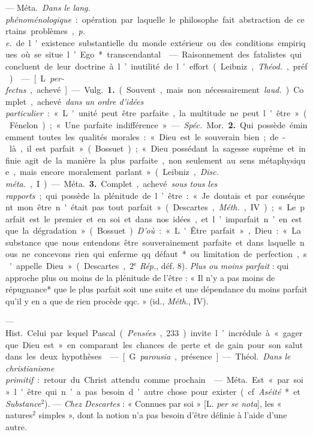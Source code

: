 \begin{itemize}[leftmargin=1cm, label=, itemsep=1pt]
 — \si{Méta.} {\it Dans le lang.
phénoménologique} : opération par laquelle le philosophe fait abstraction de
certains problèmes, {\it p. e.} de l'existence substantielle du monde
extérieur ou des conditions empiriques où se situe l’Ego* transcendantal.

 — Raisonnement des fatalistes qui concluent de
leur doctrine à l’inutilité de l'effort (Leibniz, {\it Théod.}, préf.).

 — [L. {\it per-fectus}, achevé] — \si{Vulg.} {\bf 1.} (Souvent,
mais non nécessairement {\it laud.}). Complet, achevé {\it dans un ordre
d'idées particulier} : « L'unité peut être parfaite, la multitude ne peut
l'être » (Fénelon) ; « Une parfaite indifférence ». — {\it Spéc.} \si{Mor.} 
{\bf 2.} Qui possède éminemment toutes les qualités morales : « Dieu est le
souverain bien ; de-là, il est parfait » (Bossuet) ; « Dieu possédant la
sagesse suprême et infinie agit de la manière la plus parfaite, non seulement
au sens métaphysique, mais encore moralement parlant » (Leibniz, {\it Disc.
méta.}, I).

— \si{Méta.} {\bf 3.} Complet, achevé {\it sous tous les rapports} ; qui
possède la plénitude de l’être : « Je doutais et par conséquent mon être
n'était pas tout parfait » (Descartes, {\it Méth.}, IV) ; « Le parfait est le
premier et en soi et dans nos idées, et l’imparfait n’en est que la
dégradation » (Bossuet). {\it D'où} : « L'Être parfait », Dieu : « La
substance que nous entendons être souverainement parfaite et dans laquelle
nous ne concevons rien qui enferme qq. défaut* ou limitation de
perfection, s'appelle Dieu » (Descartes, 2$^\text{e}$ {\it Rép.}, déf. 8).
{\it Plus ou moins parfait} : qui approche plus ou moins de la plénitude de
l'être : « Il n’y a pas moins de répugnance* que le plus parfait soit une
suite et une dépendance du moins parfait qu'il y en a que de rien procède
qqc. » (id., {\it Méth.}, IV).

 — \si{Hist.} Celui par lequel Pascal ({\it Pensées},
233) invite l’incrédule à « gager que Dieu est » en comparant les chances de
perte et de gain pour son salut dans les deux hypothèses.

 — [G. {\it parousia}, présence] — \si{Théol.} {\it Dans le
christianisme primitif} : retour du Christ attendu comme prochain.

 — \si{Méta.} Est « par soi » l'être qui n’a pas besoin d’autre
chose pour exister (cf. {\it Aséité}* et {\it Substance}$^2$). — {\it Chez
Descartes} : « Connues par soi » [L. {\it per se nota}], les «
natures$^2$ simples », dont la notion n’a pas besoin d’être définie à l’aide
d’une autre.


\end{itemize}
